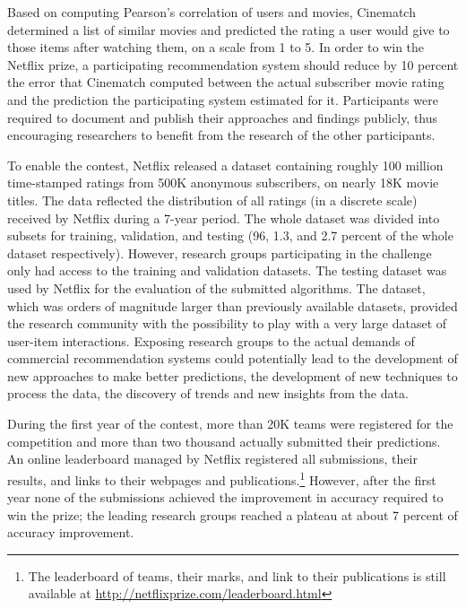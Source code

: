 Based on computing Pearson's correlation of users and movies, Cinematch determined a list of similar movies and predicted the rating a user would give to those items after watching them, on a scale from 1 to 5. 
In order to win the Netflix prize, a participating recommendation system should reduce by 10 percent the error that Cinematch computed between the actual subscriber movie rating and the prediction the participating system estimated for it. 
Participants were required to document and publish their approaches and findings publicly, thus encouraging researchers to benefit from the research of the other participants. 


To enable the contest, Netflix released a dataset containing roughly 100 million time-stamped ratings from 500K anonymous subscribers, on nearly 18K movie titles. The data reflected the distribution of all ratings (in a discrete scale) received by Netflix during a 7-year period. The whole dataset was divided into subsets for training, validation, and testing (96, 1.3, and 2.7 percent of the whole dataset respectively). 
However, research groups participating in the challenge only had access to the training and validation datasets. The testing dataset was used by Netflix for the evaluation of the submitted algorithms. 
The dataset, which was orders of magnitude larger than previously available datasets, provided the research community with the possibility to play with a very large dataset of user-item interactions. Exposing research groups to the actual demands of commercial recommendation systems could potentially lead to the development of new approaches to make better predictions, the development of new techniques to process the data, the discovery of trends and new insights from the data.



During the first year of the contest, more than 20K teams were registered for the competition and more than two thousand actually submitted their predictions. An online leaderboard managed by Netflix registered all submissions, their results, and links to their webpages and publications.\footnote{The leaderboard of teams, their marks, and link to their publications is still available at \url{http://netflixprize.com/leaderboard.html}} However, after the first year none of the submissions achieved the improvement in accuracy required to win the prize; the leading research groups reached a plateau at about 7 percent of accuracy improvement.

